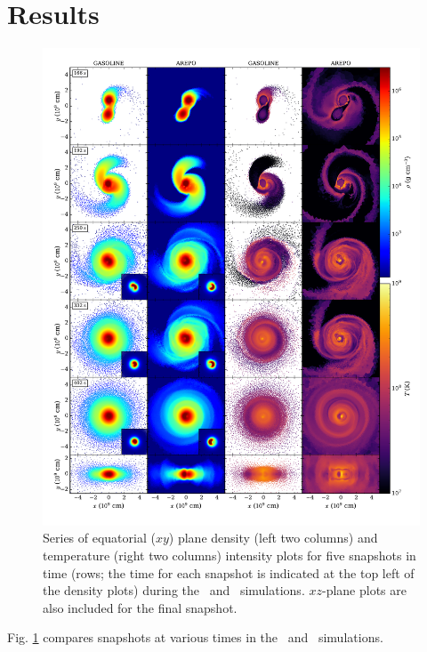 \section{Results}
\label{sec:c3_results}


\begin{figure}
\centering
\includegraphics[angle=0,width=1.0\columnwidth]{chapter3_zhu+u/figures/snapshots.pdf}
\caption{Series of equatorial ($xy$) plane density (left two columns) and temperature (right two columns) intensity plots for five snapshots in time (rows; the time for each snapshot is indicated at the top left of the density plots) during the \gasoline\ and \arepo\ simulations.  $xz$-plane plots are also included for the final snapshot.}
\label{fig:c3_diagslice}
\end{figure}

Fig. \ref{fig:c3_diagslice} compares snapshots at various times in the \gasoline\ and \arepo\ simulations.

